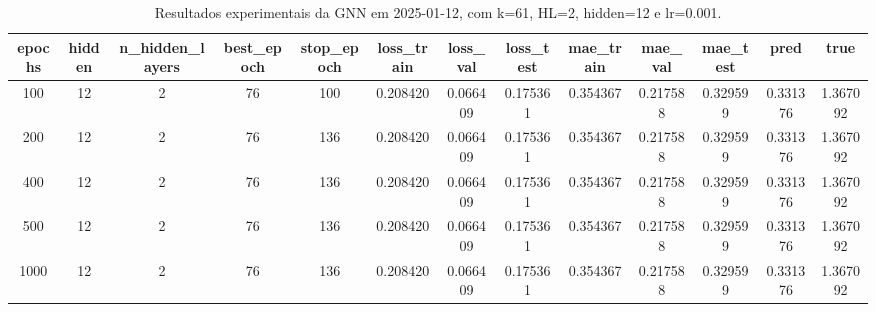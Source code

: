\begin{table}[h]
\centering
\caption{Resultados experimentais da GNN em 2025-01-12, com k=61, HL=2, hidden=12 e lr=0.001.}
\label{tab:gnn_results_k61_hl2_h12_d20250112}
\begin{tabular}{ccccccccccccc}
\toprule
epochs & hidden & n\_hidden\_layers & best\_epoch & stop\_epoch & loss\_train & loss\_val & loss\_test & mae\_train & mae\_val & mae\_test & pred & true \\
\midrule
100 & 12 & 2 & 76 & 100 & 0.208420 & 0.066409 & 0.175361 & 0.354367 & 0.217588 & 0.329599 & 0.331376 & 1.367092 \\
200 & 12 & 2 & 76 & 136 & 0.208420 & 0.066409 & 0.175361 & 0.354367 & 0.217588 & 0.329599 & 0.331376 & 1.367092 \\
400 & 12 & 2 & 76 & 136 & 0.208420 & 0.066409 & 0.175361 & 0.354367 & 0.217588 & 0.329599 & 0.331376 & 1.367092 \\
500 & 12 & 2 & 76 & 136 & 0.208420 & 0.066409 & 0.175361 & 0.354367 & 0.217588 & 0.329599 & 0.331376 & 1.367092 \\
1000 & 12 & 2 & 76 & 136 & 0.208420 & 0.066409 & 0.175361 & 0.354367 & 0.217588 & 0.329599 & 0.331376 & 1.367092 \\
\bottomrule
\end{tabular}
\end{table}
